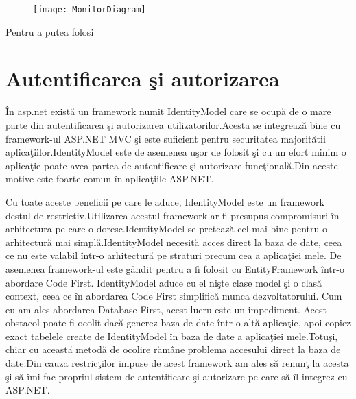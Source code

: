 \documentclass[a4paper,12pt]{report}
\begin{document}
\begin{figure}[!ht]
	\texttt{[image: MonitorDiagram]}
	\label{fig:MonitorDiagram}
\end{figure}
Pentru a putea folosi


\section{Autentificarea \c si autorizarea}

\^In asp.net exist\u a un framework numit IdentityModel care se ocup\u a de o mare parte din autentificarea \c si autorizarea
utilizatorilor.Acesta se integreaz\u a bine cu framework-ul ASP.NET MVC \c si este suficient pentru securitatea majorit\u atii 
aplica\c tiilor.IdentityModel este de asemenea u\c sor de folosit \c si cu un efort minim o aplica\c tie poate avea partea de 
autentificare \c si autorizare func\c tional\u a.Din aceste motive este foarte comun \^in aplica\c tiile ASP.NET.

Cu toate aceste beneficii pe care le aduce, IdentityModel este un framework destul de restrictiv.Utilizarea acestul framework
ar fi presupus compromisuri \^in arhitectura pe care o doresc.IdentityModel se preteaz\u a cel mai bine pentru o arhitectur\u a
mai simpl\u a.IdentityModel necesit\u a acces direct la baza de date, ceea ce nu este valabil \^intr-o arhitectur\u a pe straturi
precum cea a aplica\c tiei mele. De asemenea framework-ul este g\^andit pentru a fi folosit cu EntityFramework \^intr-o abordare 
Code First. IdentityModel aduce cu el ni\c ste clase model \c si o clas\u a context, ceea ce \^in abordarea Code First simplific\u a
munca dezvoltatorului. Cum eu am ales abordarea Database First, acest lucru este un impediment. Acest obstacol poate fi 
ocolit dac\u a generez baza de date \^intr-o alt\u a aplica\c tie, apoi copiez exact tabelele create de IdentityModel \^in 
baza de date a aplica\c tiei mele.Totu\c si, chiar cu aceast\u a metod\u a de ocolire r\u am\^ane problema accesului direct
la baza de date.Din cauza restric\c tilor impuse de acest framework am ales s\u a renun\c t la acesta \c si s\u a \^imi fac 
propriul sistem de autentificare \c si autorizare pe care s\u a \^il integrez cu ASP.NET.
\end{document}
